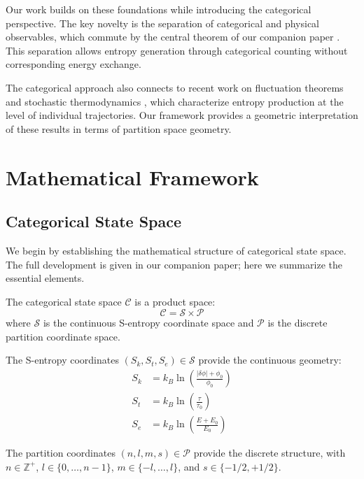 Our work builds on these foundations while introducing the categorical perspective. The key novelty is the separation of categorical and physical observables, which commute by the central theorem of our companion paper \cite{shumba2026counting}. This separation allows entropy generation through categorical counting without corresponding energy exchange.

The categorical approach also connects to recent work on fluctuation theorems \cite{jarzynski1997,crooks1999} and stochastic thermodynamics \cite{seifert2012}, which characterize entropy production at the level of individual trajectories. Our framework provides a geometric interpretation of these results in terms of partition space geometry.

\section{Mathematical Framework}

\subsection{Categorical State Space}

We begin by establishing the mathematical structure of categorical state space. The full development is given in our companion paper; here we summarize the essential elements.

\begin{definition}
The categorical state space $\mathcal{C}$ is a product space:
\begin{equation}
    \mathcal{C} = \mathcal{S} \times \mathcal{P}
\end{equation}
where $\mathcal{S}$ is the continuous S-entropy coordinate space and $\mathcal{P}$ is the discrete partition coordinate space.
\end{definition}

The S-entropy coordinates $(S_k, S_t, S_e) \in \mathcal{S}$ provide the continuous geometry:
\begin{align}
    S_k &= k_B \ln\left(\frac{|\delta\phi| + \phi_0}{\phi_0}\right) \\
    S_t &= k_B \ln\left(\frac{\tau}{\tau_0}\right) \\
    S_e &= k_B \ln\left(\frac{E + E_0}{E_0}\right)
\end{align}

The partition coordinates $(n, l, m, s) \in \mathcal{P}$ provide the discrete structure, with $n \in \mathbb{Z}^+$, $l \in \{0, \ldots, n-1\}$, $m \in \{-l, \ldots, l\}$, and $s \in \{-1/2, +1/2\}$.

